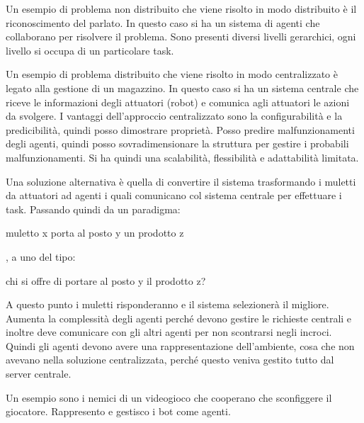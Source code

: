 \begin{esempio}
    Un esempio di problema non distribuito che viene risolto in modo distribuito
    è il riconoscimento del parlato. In questo caso si ha un sistema di agenti
    che collaborano per risolvere il problema. Sono presenti diversi livelli
    gerarchici, ogni livello si occupa di un particolare task.
\end{esempio}
\begin{esempio}
    Un esempio di problema distribuito che viene risolto in modo centralizzato è
    legato alla gestione di un magazzino. In questo caso si ha un sistema centrale
    che riceve le informazioni degli attuatori (robot) e comunica agli attuatori le
    azioni da svolgere. I vantaggi dell'approccio centralizzato sono la
    configurabilità e la predicibilità, quindi posso dimostrare proprietà. Posso
    predire malfunzionamenti degli agenti, quindi posso sovradimensionare la
    struttura per gestire i probabili malfunzionamenti. Si ha quindi una scalabilità,
    flessibilità e adattabilità limitata.

    Una soluzione alternativa è quella di convertire il sistema trasformando i
    muletti da attuatori ad agenti i quali comunicano col sistema centrale per
    effettuare i task. Passando quindi da un paradigma:
    \begin{center}
        muletto x porta al posto y un prodotto z
    \end{center},
    a uno del tipo:
    \begin{center}
        chi si offre di portare al posto y il prodotto z?
    \end{center}
    A questo punto i muletti risponderanno e il sistema selezionerà il migliore.
    Aumenta la complessità degli agenti perché devono gestire le richieste centrali
    e inoltre deve comunicare con gli altri agenti per non scontrarsi negli
    incroci. Quindi gli agenti devono avere una rappresentazione dell'ambiente,
    cosa che non avevano nella soluzione centralizzata, perché questo veniva
    gestito tutto dal server centrale.
\end{esempio}
\begin{esempio}
    Un esempio sono i nemici di un videogioco che cooperano che sconfiggere il
    giocatore. Rappresento e gestisco i bot come agenti.
\end{esempio}

